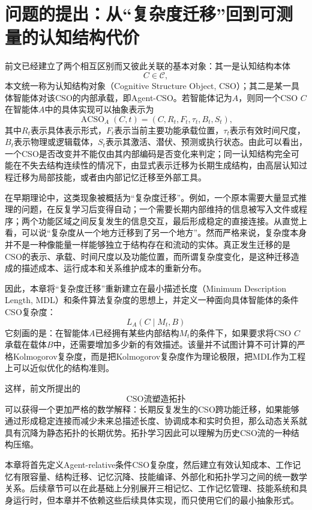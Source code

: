 \section{问题的提出：从“复杂度迁移”回到可测量的认知结构代价}

前文已经建立了两个相互区别而又彼此关联的基本对象：其一是认知结构本体
\[
C\in\mathcal{C},
\]
本文统一称为认知结构对象（Cognitive Structure Object, CSO）；其二是某一具体智能体对该CSO的内部承载，即Agent-CSO。若智能体记为$A$，则同一个CSO $C$在智能体$A$中的具体实现可以抽象表示为
\[
\operatorname{ACSO}_{A}(C,t)
=
\left(
C,
R_t,
F_t,
\tau_t,
B_t,
S_t
\right),
\]
其中$R_t$表示具体表示形式，$F_t$表示当前主要功能承载位置，$\tau_t$表示有效时间尺度，$B_t$表示物理或逻辑载体，$S_t$表示其激活、潜伏、预测或执行状态。由此可以看出，一个CSO是否改变并不能仅由其内部编码是否变化来判定；同一认知结构完全可能在不失去结构连续性的情况下，由显式表示迁移为长期生成结构，由高层认知过程迁移为局部技能，或者由内部记忆迁移至外部工具。

在早期理论中，这类现象被概括为“复杂度迁移”。例如，一个原本需要大量显式推理的问题，在反复学习后变得自动；一个需要长期内部维持的信息被写入文件或程序；两个功能区域之间反复发生的信息交互，最后形成稳定的直接连接。从直觉上看，可以说“复杂度从一个地方迁移到了另一个地方”。然而严格来说，复杂度本身并不是一种像能量一样能够独立于结构存在和流动的实体。真正发生迁移的是CSO的表示、承载、时间尺度以及功能位置，而所谓复杂度变化，是这种迁移造成的描述成本、运行成本和关系维护成本的重新分布。

因此，本章将“复杂度迁移”重新建立在最小描述长度（Minimum Description Length, MDL）和条件算法复杂度的思想上，并定义一种面向具体智能体的条件CSO复杂度：
\[
\boxed{
L_A(C\mid M_t,B)
}
\]
它刻画的是：在智能体$A$已经拥有某些内部结构$M_t$的条件下，如果要求将CSO $C$承载在载体$B$中，还需要增加多少新的有效描述。该量并不试图计算不可计算的严格Kolmogorov复杂度，而是把Kolmogorov复杂度作为理论极限，把MDL作为工程上可以近似优化的结构准则。

这样，前文所提出的
\[
\text{CSO流塑造拓扑}
\]
可以获得一个更加严格的数学解释：长期反复发生的CSO跨功能迁移，如果能够通过形成稳定连接而减少未来总描述长度、协调成本和实时负担，那么动态关系就具有沉降为静态拓扑的长期优势。拓扑学习因此可以理解为历史CSO流的一种结构压缩。

本章将首先定义Agent-relative条件CSO复杂度，然后建立有效认知成本、工作记忆有限容量、结构迁移、记忆沉降、技能编译、外部化和拓扑学习之间的统一数学关系。后续章节可以在此基础上分别展开三相记忆、工作记忆管理、技能系统和具身运行时，但本章并不依赖这些后续具体实现，而只使用它们的最小抽象形式。

